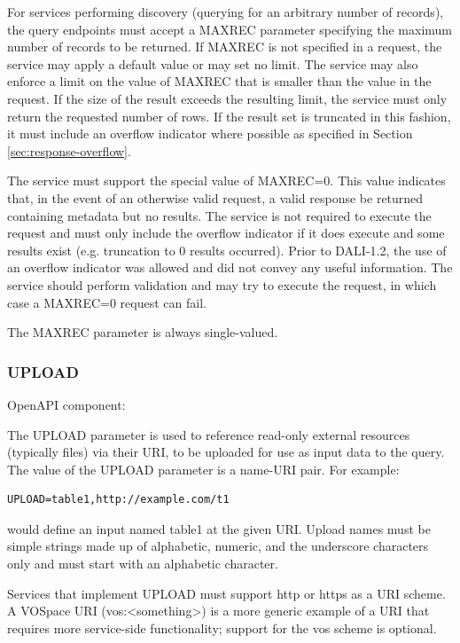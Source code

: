 \documentclass[11pt,letter]{ivoa}
\begin{document}
For services performing discovery (querying for an arbitrary number of
records), the query endpoints must accept a MAXREC parameter specifying the maximum
number of records to be returned. If MAXREC is not specified in a request, the
service may apply a default value or may set no limit. The service may also
enforce a limit on the value of MAXREC that is smaller than the value in the
request. If the size of the result exceeds the resulting limit, the service must
only return the requested number of rows. If the result set is truncated in this
fashion, it must include an overflow indicator where possible as specified in Section \ref{sec:response-overflow}.

The service must support the special value of MAXREC=0. This value indicates
that, in the event of an otherwise valid request, a valid response be returned
containing metadata but no results. The service is not required to execute the
request and must only include the overflow indicator if it does execute and some
results exist (e.g. truncation to 0 results occurred). Prior to DALI-1.2, the 
use of an overflow indicator was allowed and did not convey any useful information.
The service should perform validation and may try to execute the request, in which case
a MAXREC=0 request can fail.

The MAXREC parameter is always single-valued.

\subsubsection{UPLOAD}
\label{sec:UPLOAD}
OpenAPI component:\\ 

The UPLOAD parameter is used to reference read-only external resources
(typically files) via their URI, to be uploaded for use as input data to
the query. The value of the UPLOAD parameter is a name-URI pair. For
example:

\begin{verbatim}
UPLOAD=table1,http://example.com/t1
\end{verbatim}

\noindent
would define an input named table1 at the given URI. Upload names must be
simple strings made up of alphabetic, numeric, and the underscore characters
only and must start with an alphabetic character.

Services that implement UPLOAD must support http or https as a URI scheme.
A VOSpace URI (vos:<something>)  is a
more generic example of a URI that requires more service-side functionality;
support for the vos scheme is optional.
\end{document}
